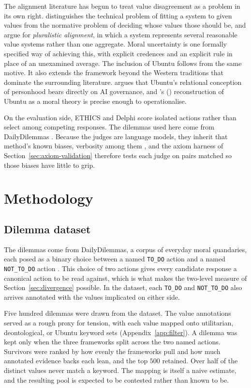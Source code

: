 \documentclass[10pt,twocolumn,a4paper]{article}
\let\cite\citep
\begin{document}
The alignment literature has begun to treat value disagreement as a
problem in its own right. \citet{gabriel2020} distinguishes the
technical problem of fitting a system to given values from the
normative problem of deciding whose values those should be, and
\citet{sorensen2024} argue for \emph{pluralistic alignment}, in which a
system represents several reasonable value systems rather than one
aggregate. Moral uncertainty is one formally specified way of achieving
this, with explicit credences and an explicit rule in place of an
unexamined average. The inclusion of Ubuntu follows from the same
motive. It also extends the framework beyond the Western traditions that
dominate the surrounding literature. \citet{mhlambi2020} argues that Ubuntu's relational
conception of personhood bears directly on AI governance, and
\citeauthor{metz2007}'s (\citeyear{metz2007}) reconstruction of Ubuntu
as a moral theory is precise enough to operationalise.

On the evaluation side, ETHICS \cite{hendrycks2020} and Delphi
\cite{jiang2021} score isolated actions rather than select among
competing responses. The dilemmas used here come from DailyDilemmas
\cite{dailydilemmas2024}. Because the judges are language
models, they inherit that method's known biases, verbosity among them
\cite{zheng2023}, and the axiom harness of
Section~\ref{sec:axiom-validation} therefore tests each judge on pairs
matched so those biases have little to grip.

\section{Methodology}
\label{sec:method}


\subsection{Dilemma dataset}
\label{sec:dataset}

The dilemmas come from DailyDilemmas, a corpus of everyday moral
quandaries, each posed as a binary choice between a named
\texttt{TO\_DO} action and a named \texttt{NOT\_TO\_DO} action
\cite{dailydilemmas2024}. This choice of two actions gives every candidate response a canonical action to be read
against, which is what makes the two-level measure of
Section~\ref{sec:divergence} possible. In the dataset, each \texttt{TO\_DO} and \texttt{NOT\_TO\_DO} 
also arrives annotated with the values implicated on either side.

Five hundred dilemmas were drawn from the dataset. The
value annotations served as a rough proxy for tension, with each value
mapped onto utilitarian, deontological, or Ubuntu keyword sets
(Appendix~\ref{app:filter}). A
dilemma was kept only when the three frameworks split across the two
named actions. Survivors were ranked by how evenly the frameworks pull
and how much annotated evidence backs each lean, and the top $500$
retained. Over
half of the distinct values never match a keyword. The mapping is
itself a naive estimate, and the resulting pool is expected to be contested
rather than known to be.
\end{document}
